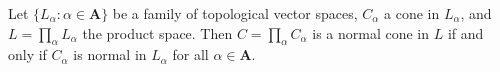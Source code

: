 Let $\{L_\alpha : \alpha \in \mathbf{A}\}$ be a family of topological vector spaces, $C_\alpha$ a cone in $L_\alpha$, and $L = \prod_\alpha L_\alpha$ the product space. Then $C = \prod_\alpha C_\alpha$ is a normal cone in $L$ if and only if $C_\alpha$ is normal in $L_\alpha$ for all $\alpha \in \mathbf{A}$.
